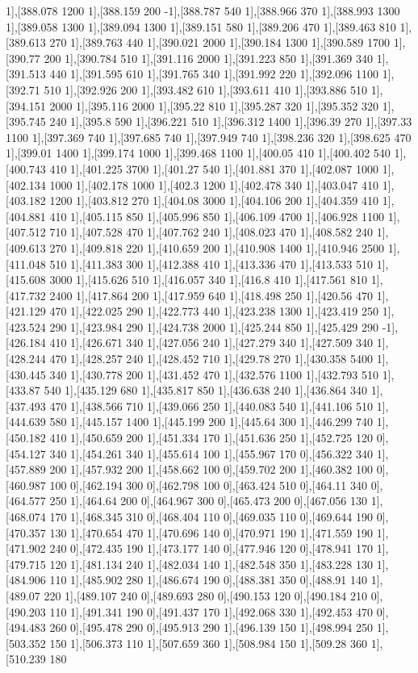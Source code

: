 {1],[388.078 1200 1],[388.159 200 -1],[388.787 540 1],[388.966 370 1],[388.993 1300 1],[389.058 1300 1],[389.094 1300 1],[389.151 580 1],[389.206 470 1],[389.463 810 1],[389.613 270 1],[389.763 440 1],[390.021 2000 1],[390.184 1300 1],[390.589 1700 1],[390.77 200 1],[390.784 510 1],[391.116 2000 1],[391.223 850 1],[391.369 340 1],[391.513 440 1],[391.595 610 1],[391.765 340 1],[391.992 220 1],[392.096 1100 1],[392.71 510 1],[392.926 200 1],[393.482 610 1],[393.611 410 1],[393.886 510 1],[394.151 2000 1],[395.116 2000 1],[395.22 810 1],[395.287 320 1],[395.352 320 1],[395.745 240 1],[395.8 590 1],[396.221 510 1],[396.312 1400 1],[396.39 270 1],[397.33 1100 1],[397.369 740 1],[397.685 740 1],[397.949 740 1],[398.236 320 1],[398.625 470 1],[399.01 1400 1],[399.174 1000 1],[399.468 1100 1],[400.05 410 1],[400.402 540 1],[400.743 410 1],[401.225 3700 1],[401.27 540 1],[401.881 370 1],[402.087 1000 1],[402.134 1000 1],[402.178 1000 1],[402.3 1200 1],[402.478 340 1],[403.047 410 1],[403.182 1200 1],[403.812 270 1],[404.08 3000 1],[404.106 200 1],[404.359 410 1],[404.881 410 1],[405.115 850 1],[405.996 850 1],[406.109 4700 1],[406.928 1100 1],[407.512 710 1],[407.528 470 1],[407.762 240 1],[408.023 470 1],[408.582 240 1],[409.613 270 1],[409.818 220 1],[410.659 200 1],[410.908 1400 1],[410.946 2500 1],[411.048 510 1],[411.383 300 1],[412.388 410 1],[413.336 470 1],[413.533 510 1],[415.608 3000 1],[415.626 510 1],[416.057 340 1],[416.8 410 1],[417.561 810 1],[417.732 2400 1],[417.864 200 1],[417.959 640 1],[418.498 250 1],[420.56 470 1],[421.129 470 1],[422.025 290 1],[422.773 440 1],[423.238 1300 1],[423.419 250 1],[423.524 290 1],[423.984 290 1],[424.738 2000 1],[425.244 850 1],[425.429 290 -1],[426.184 410 1],[426.671 340 1],[427.056 240 1],[427.279 340 1],[427.509 340 1],[428.244 470 1],[428.257 240 1],[428.452 710 1],[429.78 270 1],[430.358 5400 1],[430.445 340 1],[430.778 200 1],[431.452 470 1],[432.576 1100 1],[432.793 510 1],[433.87 540 1],[435.129 680 1],[435.817 850 1],[436.638 240 1],[436.864 340 1],[437.493 470 1],[438.566 710 1],[439.066 250 1],[440.083 540 1],[441.106 510 1],[444.639 580 1],[445.157 1400 1],[445.199 200 1],[445.64 300 1],[446.299 740 1],[450.182 410 1],[450.659 200 1],[451.334 170 1],[451.636 250 1],[452.725 120 0],[454.127 340 1],[454.261 340 1],[455.614 100 1],[455.967 170 0],[456.322 340 1],[457.889 200 1],[457.932 200 1],[458.662 100 0],[459.702 200 1],[460.382 100 0],[460.987 100 0],[462.194 300 0],[462.798 100 0],[463.424 510 0],[464.11 340 0],[464.577 250 1],[464.64 200 0],[464.967 300 0],[465.473 200 0],[467.056 130 1],[468.074 170 1],[468.345 310 0],[468.404 110 0],[469.035 110 0],[469.644 190 0],[470.357 130 1],[470.654 470 1],[470.696 140 0],[470.971 190 1],[471.559 190 1],[471.902 240 0],[472.435 190 1],[473.177 140 0],[477.946 120 0],[478.941 170 1],[479.715 120 1],[481.134 240 1],[482.034 140 1],[482.548 350 1],[483.228 130 1],[484.906 110 1],[485.902 280 1],[486.674 190 0],[488.381 350 0],[488.91 140 1],[489.07 220 1],[489.107 240 0],[489.693 280 0],[490.153 120 0],[490.184 210 0],[490.203 110 1],[491.341 190 0],[491.437 170 1],[492.068 330 1],[492.453 470 0],[494.483 260 0],[495.478 290 0],[495.913 290 1],[496.139 150 1],[498.994 250 1],[503.352 150 1],[506.373 110 1],[507.659 360 1],[508.984 150 1],[509.28 360 1],[510.239 180 }
